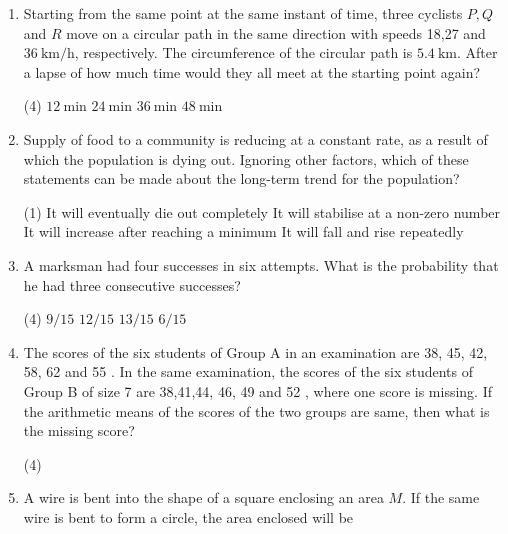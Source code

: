 \begin{enumerate}
 \begin{tasks}(4)
	\task[\textbf{a.}] $G$
	\task[\textbf{b.}] $B$
	\task[\textbf{c.}]$D$
	\task[\textbf{d.}]  $F$
\end{tasks}
\item Starting from the same point at the same instant of time, three cyclists $P, Q$ and $R$ move on a circular path in the same direction with speeds 18,27 and $36 \mathrm{~km} / \mathrm{h}$, respectively. The circumference of the circular path is $5.4 \mathrm{~km}$. After a lapse of how much time would they all meet at the starting point again?
 \begin{tasks}(4)
	\task[\textbf{a.}] $12 \mathrm{~min}$
	\task[\textbf{b.}]$24 \mathrm{~min}$
	\task[\textbf{c.}]$36 \mathrm{~min}$
	\task[\textbf{d.}]  $48 \mathrm{~min}$
\end{tasks}
\item  Supply of food to a community is reducing at a constant rate, as a result of which the population is dying out. Ignoring other factors, which of these statements can be made about the long-term trend for the population?
 \begin{tasks}(1)
	\task[\textbf{a.}]It will eventually die out completely
	\task[\textbf{b.}]It will stabilise at a non-zero number
	\task[\textbf{c.}]It will increase after reaching a minimum
	\task[\textbf{d.}]It will fall and rise repeatedly
\end{tasks}
\item  A marksman had four successes in six attempts. What is the probability that he had three consecutive successes?
	 \begin{tasks}(4)
		\task[\textbf{a.}]$9 / 15$
		\task[\textbf{b.}] $12 / 15$
		\task[\textbf{c.}]$13 / 15$
		\task[\textbf{d.}] $6 / 15$
	\end{tasks}
\item  The scores of the six students of Group A in an examination are 38, 45, 42, 58, 62 and 55 . In the same examination, the scores of the six students of Group B of size 7 are 38,41,44, 46, 49 and 52 , where one score is missing. If the arithmetic means of the scores of the two groups are same, then what is the missing score?
 \begin{tasks}(4)
\end{tasks}
\item  A wire is bent into the shape of a square enclosing an area $M$. If the same wire is bent to form a circle, the area enclosed will be

\end{enumerate}
